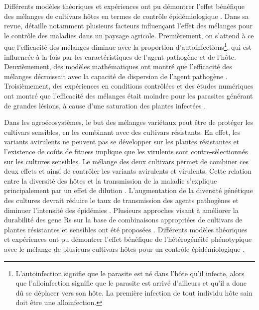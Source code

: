 	Différents modèles théoriques et expériences ont pu démontrer l’effet bénéfique des mélanges de cultivars hôtes en termes de contrôle épidémiologique \citep{Zhu2000,  Mundt2002, Wolfe1985, Kiyosawa1982, Garrett1999}.
Dans sa revue,  \citep{Mundt2002} détaille notamment plusieurs facteurs influençant l'effet des mélanges pour le contrôle des maladies dans un paysage agricole.
Premièrement, on s'attend à ce que l'efficacité des mélanges diminue avec la proportion d’autoinfections\footnote{L'autoinfection  signifie que le parasite est né dans l'hôte qu'il infecte, alors que l'alloinfection signifie que le parasite est arrivé d'ailleurs et qu'il a donc dû se déplacer vers son hôte. La première infection de tout individu hôte sain doit être une alloinfection.}, qui est influencée à la fois par les caractéristiques de l'agent pathogène et de l'hôte.
Deuxièmement, des modèles mathématiques ont montré que l'efficacité des mélanges décroissait
avec la capacité de dispersion de l’agent pathogène \citep{Fitt1986}. 
Troisièmement, des expériences en conditions contrôlées et des études numériques ont montré que l'efficacité des mélanges était moindre pour les parasites générant de grandes lésions, à cause d'une saturation des  plantes infectées \citep{Lannou1994}. 

	
	Dans les agroécosystèmes,  le but des mélanges variétaux peut être  de protéger les cultivars sensibles, en les combinant avec des cultivars résistants. En effet, les variants avirulents ne peuvent pas se développer sur  les plantes résistantes et l'existence de coûts de fitness implique que les virulents sont contre-sélectionnés sur les cultures sensibles. Le mélange des deux cultivars permet de combiner ces deux effets et ainsi de contrôler les variants avirulents et virulents.
Cette relation entre la diversité des hôtes et la transmission de la maladie s'explique principalement par un effet de dilution \citep{Mundt2002}.   L'augmentation de la diversité génétique des cultures devrait réduire le taux de transmission des agents pathogènes et diminuer l'intensité des épidémies \citep{Mundt2002}.
Plusieurs approches visant à améliorer la durabilité des \glspl{gene R} sur la base de combinaisons appropriées de cultivars de plantes résistantes et sensibles ont été proposées \citep{vandenBosch2003, LoIacono2012, Fabre2012,  Fabre2015, Lof2017}.
Différents modèles théoriques et expériences   ont pu démontrer l’effet bénéfique de l’hétérogénéité phénotypique avec le mélange de plusieurs cultivars hôtes pour un contrôle épidémiologique  \citep{Mundt2002, Wolfe1985, Kiyosawa1982, Zhu2000}.
	
